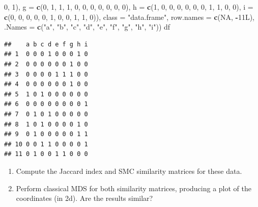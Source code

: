\documentclass[
]{book}
\newenvironment{Shaded}{\begin{snugshade}}{\end{snugshade}}
\newcommand{\AttributeTok}[1]{\textcolor[rgb]{0.13,0.29,0.53}{#1}}
\newcommand{\ConstantTok}[1]{\textcolor[rgb]{0.56,0.35,0.01}{#1}}
\newcommand{\DecValTok}[1]{\textcolor[rgb]{0.00,0.00,0.81}{#1}}
\newcommand{\FunctionTok}[1]{\textcolor[rgb]{0.13,0.29,0.53}{\textbf{#1}}}
\newcommand{\NormalTok}[1]{#1}
\newcommand{\SpecialCharTok}[1]{\textcolor[rgb]{0.81,0.36,0.00}{\textbf{#1}}}
\newcommand{\StringTok}[1]{\textcolor[rgb]{0.31,0.60,0.02}{#1}}
\theoremstyle{definition}
\theoremstyle{definition}
\theoremstyle{definition}
\theoremstyle{definition}
\theoremstyle{remark}
\begin{document}
\begin{Shaded}
\begin{Highlighting}[]
\DecValTok{0}\NormalTok{, }\DecValTok{1}\NormalTok{), }\AttributeTok{g =} \FunctionTok{c}\NormalTok{(}\DecValTok{0}\NormalTok{, }\DecValTok{1}\NormalTok{, }\DecValTok{1}\NormalTok{, }\DecValTok{1}\NormalTok{, }\DecValTok{0}\NormalTok{, }\DecValTok{0}\NormalTok{, }\DecValTok{0}\NormalTok{, }\DecValTok{0}\NormalTok{, }\DecValTok{0}\NormalTok{, }\DecValTok{0}\NormalTok{, }\DecValTok{0}\NormalTok{), }\AttributeTok{h =} \FunctionTok{c}\NormalTok{(}\DecValTok{1}\NormalTok{, }\DecValTok{0}\NormalTok{, }\DecValTok{0}\NormalTok{, }
\DecValTok{0}\NormalTok{, }\DecValTok{0}\NormalTok{, }\DecValTok{0}\NormalTok{, }\DecValTok{0}\NormalTok{, }\DecValTok{1}\NormalTok{, }\DecValTok{1}\NormalTok{, }\DecValTok{0}\NormalTok{, }\DecValTok{0}\NormalTok{), }\AttributeTok{i =} \FunctionTok{c}\NormalTok{(}\DecValTok{0}\NormalTok{, }\DecValTok{0}\NormalTok{, }\DecValTok{0}\NormalTok{, }\DecValTok{0}\NormalTok{, }\DecValTok{0}\NormalTok{, }\DecValTok{1}\NormalTok{, }\DecValTok{0}\NormalTok{, }\DecValTok{0}\NormalTok{, }\DecValTok{1}\NormalTok{, }\DecValTok{1}\NormalTok{, }
\DecValTok{0}\NormalTok{)), }\AttributeTok{class =} \StringTok{"data.frame"}\NormalTok{, }\AttributeTok{row.names =} \FunctionTok{c}\NormalTok{(}\ConstantTok{NA}\NormalTok{, }\SpecialCharTok{{-}}\NormalTok{11L), }\AttributeTok{.Names =} \FunctionTok{c}\NormalTok{(}\StringTok{"a"}\NormalTok{, }
\StringTok{"b"}\NormalTok{, }\StringTok{"c"}\NormalTok{, }\StringTok{"d"}\NormalTok{, }\StringTok{"e"}\NormalTok{, }\StringTok{"f"}\NormalTok{, }\StringTok{"g"}\NormalTok{, }\StringTok{"h"}\NormalTok{, }\StringTok{"i"}\NormalTok{))}
\NormalTok{df}
\end{Highlighting}
\end{Shaded}

\begin{verbatim}
##    a b c d e f g h i
## 1  0 0 0 1 0 0 0 1 0
## 2  0 0 0 0 0 0 1 0 0
## 3  0 0 0 0 1 1 1 0 0
## 4  0 0 0 0 0 0 1 0 0
## 5  1 0 1 0 0 0 0 0 0
## 6  0 0 0 0 0 0 0 0 1
## 7  0 1 0 1 0 0 0 0 0
## 8  1 0 1 0 0 0 0 1 0
## 9  0 1 0 0 0 0 0 1 1
## 10 0 0 1 1 0 0 0 0 1
## 11 0 1 0 0 1 1 0 0 0
\end{verbatim}

\begin{enumerate}
\def\labelenumi{\roman{enumi}.}
\item
  Compute the Jaccard index and SMC similarity matrices for these data.
\item
  Perform classical MDS for both similarity matrices, producing a plot of the coordinates (in 2d). Are the results similar?
\end{enumerate}
\end{document}

